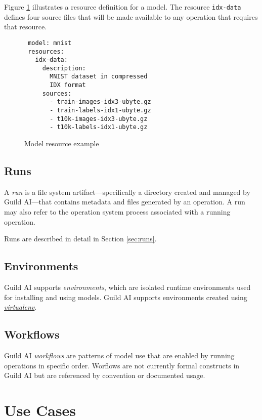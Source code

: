 \documentclass{article}
\begin{document}
Figure \ref{fig:resource} illustrates a resource definition for a
model. The resource \verb|idx-data| defines four source files that
will be made available to any operation that requires that resource.

\begin{figure}
{\footnotesize
\begin{verbatim}
 model: mnist
 resources:
   idx-data:
     description:
       MNIST dataset in compressed
       IDX format
     sources:
       - train-images-idx3-ubyte.gz
       - train-labels-idx1-ubyte.gz
       - t10k-images-idx3-ubyte.gz
       - t10k-labels-idx1-ubyte.gz
\end{verbatim}}
\caption{Model resource example}
\label{fig:resource}
\end{figure}

\subsection{Runs}

A \emph{run} is a file system artifact---specifically a directory
created and managed by Guild AI---that contains metadata and files
generated by an operation. A run may also refer to the operation
system process associated with a running operation.

Runs are described in detail in Section \ref{sec:runs}.

\subsection{Environments}

Guild AI supports \emph{environments}, which are isolated runtime
environments used for installing and using models. Guild AI supports
environments created using
\href{https://virtualenv.pypa.io}{\emph{virtualenv}}.

\subsection{Workflows}

Guild AI \emph{workflows} are patterns of model use that are enabled
by running operations in specific order. Worflows are not currently
formal constructs in Guild AI but are referenced by convention or
documented usage.

\section{Use Cases}
\label{sec:use-cases}
\end{document}
